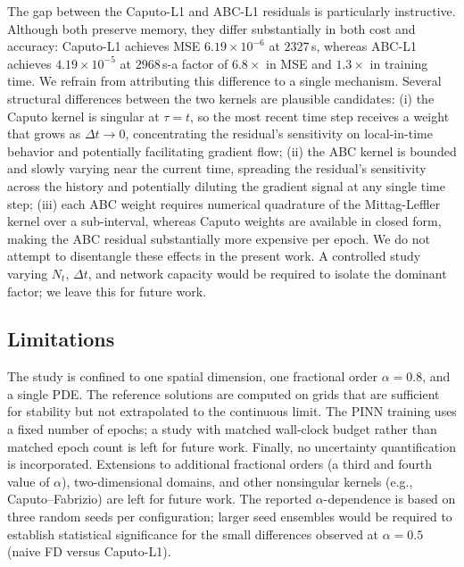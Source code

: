\documentclass[11pt]{article}
\begin{document}
The gap between the Caputo-L1 and ABC-L1 residuals is particularly
instructive. Although both preserve memory, they differ substantially in
both cost and accuracy: Caputo-L1 achieves MSE \(6.19\times 10^{-6}\) at
\(2327\)\,s, whereas ABC-L1 achieves \(4.19\times 10^{-5}\) at
\(2968\)\,s-a factor of \(6.8\times\) in MSE and \(1.3\times\) in
training time. We refrain from attributing this difference to a single
mechanism. Several structural differences between the two kernels are
plausible candidates: (i) the Caputo kernel is singular at \(\tau=t\),
so the most recent time step receives a weight that grows as
\(\Delta t\to 0\), concentrating the residual's sensitivity on
local-in-time behavior and potentially facilitating gradient flow;
(ii) the ABC kernel is bounded and slowly varying near the current time,
spreading the residual's sensitivity across the history and potentially
diluting the gradient signal at any single time step; (iii) each ABC
weight requires numerical quadrature of the Mittag-Leffler kernel over
a sub-interval, whereas Caputo weights are available in closed form,
making the ABC residual substantially more expensive per epoch. We do
not attempt to disentangle these effects in the present work. A
controlled study varying \(N_t\), \(\Delta t\), and network capacity
would be required to isolate the dominant factor; we leave this for
future work.

\subsection{Limitations}
\label{sec:limitations}

The study is confined to one spatial dimension, one fractional order \(\alpha=0.8\), and a single PDE. The reference solutions are computed on grids that are sufficient for stability but not extrapolated to the continuous limit. The PINN training uses a fixed number of epochs; a study with matched wall-clock budget rather than matched epoch count is left for future work. Finally, no uncertainty quantification is incorporated. Extensions to additional fractional orders (a third and fourth
value of \(\alpha\)), two-dimensional domains, and other nonsingular
kernels (e.g., Caputo--Fabrizio) are left for future work. The reported
\(\alpha\)-dependence is based on three random seeds per configuration;
larger seed ensembles would be required to establish statistical
significance for the small differences observed at \(\alpha=0.5\)
(naive FD versus Caputo-L1).

\end{document}
